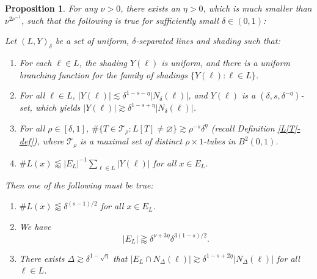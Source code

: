 \documentclass{amsart}
\numberwithin{equation}{section}
\newtheorem{proposition}[theorem]{Proposition}
\newcommand{\de}{\delta}
\newcommand{\De}{\Delta}
\newcommand{\cT}{{\mathcal T}}
\begin{document}
\begin{proposition}
\label{prop-induction}
For any $\nu>0$, there exists an $\eta>0$, which is much smaller than $\nu^{2\nu^{-1}}$, such that the following is true for sufficiently small $\de\in(0,1)$:


Let $(L,Y)_\de$ be a set of uniform, $\de$-separated lines and shading such that:
\begin{enumerate}
    \item For each $\ell\in L$, the shading $Y(\ell)$ is uniform, and there is a uniform branching function for the family of shadings $\{Y(\ell):\ell\in L\}$.
    \item For all $\ell\in L$, $|Y(\ell)|\lesssim\de^{1-s-\eta}|N_\de(\ell)|$, and $Y(\ell)$ is a $(\de,s, \de^{-\eta})$-set, which yields $|Y(\ell)|\gtrsim\de^{1-s+\eta}|N_\de(\ell)|$.
    \item For all $\rho\in[\de,1]$, $\#\{T\in\cT_\rho:L[T]\not=\varnothing\}\gtrsim \rho^{-s}\de^\eta$ (recall Definition \ref{L[T]-def}), where $\cT_\rho$ is a maximal set of distinct $\rho\times1$-tubes in $B^2(0,1)$.
    \item $\#L(x)\lessapprox |E_L|^{-1}\sum_{\ell\in L}|Y(\ell)|$ for all $x\in E_L$.
\end{enumerate}
Then one of the following must be true:
\begin{enumerate}
    \item $\# L(x)\lessapprox\de^{(s-1)/2}$ for all $x\in E_L$.
    \item We have
    \begin{equation}
        |E_L|\gtrapprox \de^{\nu+3\eta}\de^{3(1-s)/2}.
    \end{equation}
    \item There exists $\De\gtrsim \de^{1-\sqrt{\eta}}$ that $|E_L\cap N_{\De}(\ell)|\gtrsim \de^{1-s+2\eta}|N_{\De}(\ell)|$ for all $\ell\in L$.
\end{enumerate}

\end{proposition}
\end{document}
